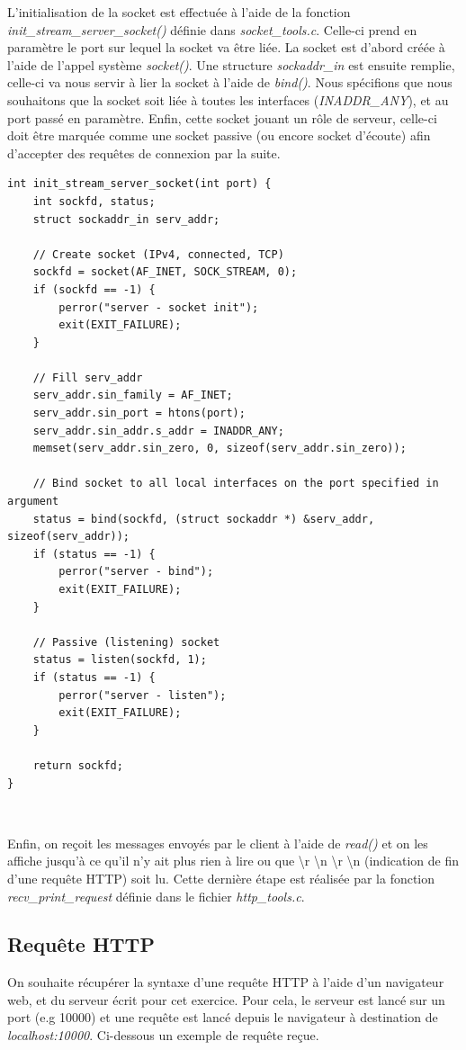 L'initialisation de la socket est effectuée à l'aide de la fonction \emph{init\_stream\_server\_socket()} définie dans \emph{socket\_tools.c}. Celle-ci prend en paramètre le port sur lequel la socket va être liée. La socket est d'abord créée à l'aide de l'appel système \emph{socket()}. Une structure \emph{sockaddr\_in} est ensuite remplie, celle-ci va nous servir à lier la socket à l'aide de \emph{bind()}. Nous spécifions que nous souhaitons que la socket soit liée à toutes les interfaces (\emph{INADDR\_ANY}), et au port passé en paramètre. Enfin, cette socket jouant un rôle de serveur, celle-ci doit être marquée comme une socket passive (ou encore socket d'écoute) afin d'accepter des requêtes de connexion par la suite.\\

\begin{lstlisting}
int init_stream_server_socket(int port) {
    int sockfd, status;
    struct sockaddr_in serv_addr;

    // Create socket (IPv4, connected, TCP)
    sockfd = socket(AF_INET, SOCK_STREAM, 0);
    if (sockfd == -1) {
        perror("server - socket init");
        exit(EXIT_FAILURE);
    }

    // Fill serv_addr
    serv_addr.sin_family = AF_INET;
    serv_addr.sin_port = htons(port);
    serv_addr.sin_addr.s_addr = INADDR_ANY;
    memset(serv_addr.sin_zero, 0, sizeof(serv_addr.sin_zero));

    // Bind socket to all local interfaces on the port specified in argument
    status = bind(sockfd, (struct sockaddr *) &serv_addr, sizeof(serv_addr));
    if (status == -1) {
        perror("server - bind");
        exit(EXIT_FAILURE);
    }

    // Passive (listening) socket
    status = listen(sockfd, 1);
    if (status == -1) {
        perror("server - listen");
        exit(EXIT_FAILURE);
    }

    return sockfd;
}
\end{lstlisting}
\

Enfin, on reçoit les messages envoyés par le client à l'aide de \emph{read()} et on les affiche jusqu'à ce qu'il n'y ait plus rien à lire ou que {\textbackslash r \textbackslash n \textbackslash r \textbackslash n} (indication de fin d'une requête HTTP) soit lu. Cette dernière étape est réalisée par la fonction \emph{recv\_print\_request} définie dans le fichier \emph{http\_tools.c}.

\subsection{Requête HTTP}
On souhaite récupérer la syntaxe d'une requête HTTP à l'aide d'un navigateur web, et du serveur écrit pour cet exercice. Pour cela, le serveur est lancé sur un port (e.g 10000) et une requête est lancé depuis le navigateur à destination de \emph{localhost:10000}. Ci-dessous un exemple de requête reçue.

